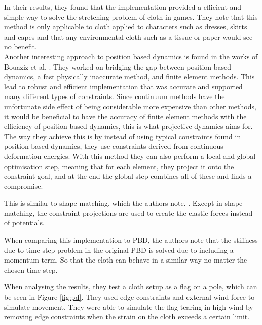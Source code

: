 \documentclass[12pt,a4paper]{article}
\begin{document}
In their results, they found that the implementation provided a efficient and simple way to solve the stretching problem of cloth in games. They note that this method is only applicable to cloth applied to characters such as dresses, skirts and capes and that any environmental cloth such as a tissue or paper would see no benefit.
\\

Another interesting approach to position based dynamics is found in the works of Bouaziz et al. \cite{projectivedynamics}. They worked on bridging the gap between position based dynamics, a fast physically inaccurate method, and finite element methods. This lead to robust and efficient implementation that was accurate and supported many different types of constraints. Since continuum methods have the unfortunate side effect of being considerable more expensive than other methods, it would be beneficial to have the accuracy of finite element methods with the efficiency of position based dynamics, this is what projective dynamics aims for. The way they achieve this is by instead of using typical constraints found in position based dynamics, they use constraints derived from continuous deformation energies. With this method they can also perform a local and global optimisation step, meaning that for each element, they project it onto the constraint goal, and at the end the global step combines all of these and finds a compromise. 

This is similar to shape matching, which the authors note. \cite{ogshapematching}. Except in shape matching, the constraint projections are used to create the elastic forces instead of potentials.

When comparing this implementation to PBD, the authors note that the stiffness due to time step problem in the original PBD is solved due to including a momentum term. So that the cloth can behave in a similar way no matter the chosen time step.

When analysing the results, they test a cloth setup as a flag on a pole, which can be seen in Figure \ref{fig:pd}. They used edge constraints and external wind force to simulate movement. They were able to simulate the flag tearing in high wind by removing edge constraints when the strain on the cloth exceeds a certain limit.
\\
\end{document}
